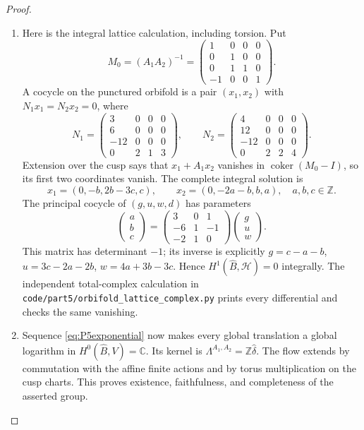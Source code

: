 \begin{proof}
\begin{enumerate}[label=\arabic*.,leftmargin=*]
\item Here is the integral lattice calculation, including torsion.  Put
\[
 M_0=(A_1A_2)^{-1}=\begin{pmatrix}1&0&0&0\\0&1&0&0\\0&1&1&0\\-1&0&0&1\end{pmatrix}.
\]
A cocycle on the punctured orbifold is a pair $(x_1,x_2)$ with
$N_1x_1=N_2x_2=0$, where
\[
 N_1=\begin{pmatrix}3&0&0&0\\6&0&0&0\\-12&0&0&0\\0&2&1&3\end{pmatrix},\qquad
 N_2=\begin{pmatrix}4&0&0&0\\12&0&0&0\\-12&0&0&0\\0&2&2&4\end{pmatrix}.
\]
Extension over the cusp says that $x_1+A_1x_2$ vanishes in
$\operatorname{coker}(M_0-I)$, so its first two coordinates vanish.
The complete integral solution is
\[
 x_1=(0,-b,2b-3c,c),\qquad x_2=(0,-2a-b,b,a),\quad a,b,c\in\mathbb Z.
\]
The principal cocycle of $(g,u,w,d)$ has parameters
\[
 \begin{pmatrix}a\\b\\c\end{pmatrix}
 =\begin{pmatrix}3&0&1\\-6&1&-1\\-2&1&0\end{pmatrix}
  \begin{pmatrix}g\\u\\w\end{pmatrix}.
\]
This matrix has determinant $-1$; its inverse is explicitly
$g=c-a-b$, $u=3c-2a-2b$, $w=4a+3b-3c$.  Hence
$H^1(\widehat B,\mathcal H)=0$ integrally.  The independent total-complex
calculation in \texttt{code/part5/orbifold\_lattice\_complex.py} prints
every differential and checks the same vanishing.

\item Sequence \eqref{eq:P5exponential} now makes every global translation a
global logarithm in $H^0(\widehat B,V)=\mathbb C$.  Its kernel is
$\Lambda^{A_1,A_2}=\mathbb Z\widehat\delta$.  The flow extends by
commutation with the affine finite actions and by torus multiplication
on the cusp charts.  This proves existence, faithfulness, and
completeness of the asserted group.
\end{enumerate}
\end{proof}

